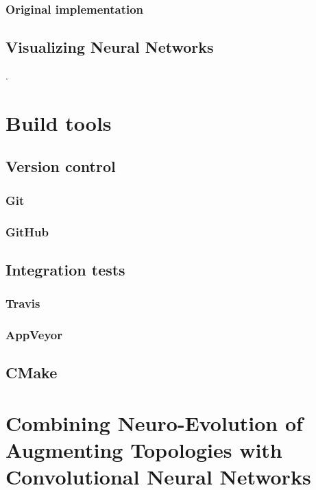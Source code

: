 \documentclass[11pt]{article}
\begin{document}
			\subsubsection{Original implementation}
				
		\subsection{Visualizing Neural Networks}
			.
	\newpage

	\section{Build tools}
		\subsection{Version control}
			
			\subsubsection{Git}
				
			\subsubsection{GitHub}
				
		\subsection{Integration tests}
			
			\subsubsection{Travis}
				
			\subsubsection{AppVeyor}
				
		\subsection{CMake}
			
	\newpage

	\section{Combining Neuro-Evolution of Augmenting Topologies with Convolutional Neural Networks}
\end{document}
